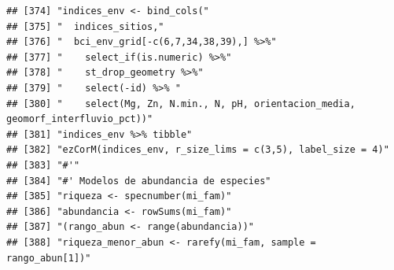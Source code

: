 \documentclass[11pt,]{article}
\begin{document}
\begin{verbatim}
## [374] "indices_env <- bind_cols("                                                                                                                                             
## [375] "  indices_sitios,"                                                                                                                                                     
## [376] "  bci_env_grid[-c(6,7,34,38,39),] %>%"                                                                                                                                 
## [377] "    select_if(is.numeric) %>%"                                                                                                                                         
## [378] "    st_drop_geometry %>%"                                                                                                                                              
## [379] "    select(-id) %>% "                                                                                                                                                  
## [380] "    select(Mg, Zn, N.min., N, pH, orientacion_media, geomorf_interfluvio_pct))"                                                                                        
## [381] "indices_env %>% tibble"                                                                                                                                                
## [382] "ezCorM(indices_env, r_size_lims = c(3,5), label_size = 4)"                                                                                                             
## [383] "#'"                                                                                                                                                                    
## [384] "#' Modelos de abundancia de especies"                                                                                                                                  
## [385] "riqueza <- specnumber(mi_fam)"                                                                                                                                         
## [386] "abundancia <- rowSums(mi_fam)"                                                                                                                                         
## [387] "(rango_abun <- range(abundancia))"                                                                                                                                     
## [388] "riqueza_menor_abun <- rarefy(mi_fam, sample = rango_abun[1])"                                                                                                          

\end{verbatim}
\end{document}

